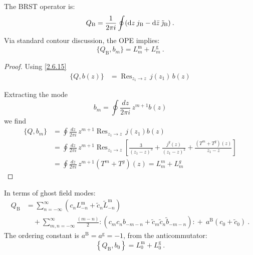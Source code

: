 The BRST operator is:
\begin{equation}
	Q_{\mathrm{B}}=\frac{1}{2 \pi i} \oint (\mathrm{d} z\: j_{\mathrm{B}}- \mathrm{d} \bar{z} \: \tilde{\jmath}_{\mathrm{B}}) \:. \label{4.3.5}
\end{equation}
Via standard contour discussion, the OPE implies:
\begin{equation}
	\{Q_{\mathrm{B}}, b_{m}\}=L_{m}^{\mathrm{m}}+L_{m}^{\mathrm{g}} \:. \label{4.3.6}
\end{equation}
\begin{tcolorbox}
	\begin{proof} Using \eqref{2.6.15}
		\begin{align}
			\{Q, b(z)\} &= \operatorname{Res}_{z_1 \to z}\, j(z_1)\, b(z)
		\end{align}
		
		Extracting the mode 
		\[
		b_m = \oint \frac{dz}{2\pi i}\, z^{m+1} b(z)
		\]
		we find
		\begin{align}
			\{Q, b_m\}
			&= \oint \frac{dz}{2\pi i}\, z^{m+1}
			\operatorname{Res}_{z_1 \to z}\, j(z_1) b(z)\nonumber \\
			&= \oint \frac{dz}{2\pi i}\, z^{m+1}	\operatorname{Res}_{z_1 \to z}\left[	\frac{3}{(z_1 - z)^3}	+ \frac{j^g(z)}{(z_1 - z)^2}	+ \frac{(T^m + T^g)(z)}{z_1 -z}\right] \nonumber\\
			&= \oint \frac{dz}{2\pi i}\, z^{m+1} (T^m + T^g)(z)
			= L_m^m + L_m^g
		\end{align}
	\end{proof}
\end{tcolorbox}
In terms of ghost field modes:
\begin{align}
	Q_{\mathrm{B}}&= \sum_{n=-\infty}^{\infty} (c_{n} L_{-n}^{\mathrm{m}}+\tilde{c}_{n} \tilde{L}_{-n}^{\mathrm{m}})  \nonumber \\
	&\quad  +\sum_{m, n=-\infty}^{\infty} \frac{(m-n)}{2} \mathrel{ : (c_{m} c_{n} b_{-m-n}+\tilde{c}_{m} \tilde{c}_{n} \tilde{b}_{-m-n}) : }+\: a^{\mathrm{B}} (c_{0}+\tilde{c}_{0}) \:. \label{4.3.7}
\end{align}
The ordering constant is $a^{\mathrm{B}}=a^{\mathrm{g}}=-1$, from the anticommutator:
\begin{equation}
	\left\{Q_{\mathrm{B}}, b_{0}\right\}=L_{0}^{\mathrm{m}}+L_{0}^{\mathrm{g}} \:. \label{4.3.8}
\end{equation}
	
